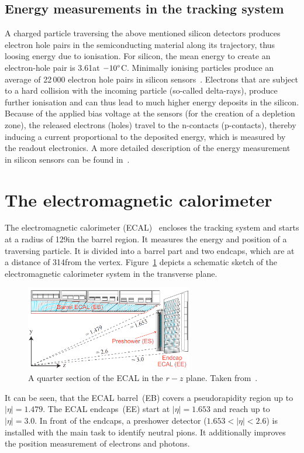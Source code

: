 \subsection*{Energy measurements in the tracking system}
A charged particle traversing the above mentioned silicon detectors produces electron hole pairs in the semiconducting material along its trajectory, thus loosing energy due to ionisation.
For silicon, the mean energy to create an electron-hole pair is 3.61\ev at $-10\degree$C.
Minimally ionising particles produce an average of 22\,000 electron hole pairs in silicon sensors~\cite{Thesis_Jenny}.
Electrons that are subject to a hard collision with the incoming particle (so-called delta-rays), produce further ionisation and can thus lead to much higher energy deposits in the silicon.
Because of the applied bias voltage at the sensors (for the creation of a depletion zone), the released electrons (holes) travel to the n-contacts (p-contacts), thereby inducing a current proportional to the deposited energy, which is measured by the readout electronics. 
A more detailed description of the energy measurement in silicon sensors can be found in~\cite{Thesis_Jenny}.

\section{The electromagnetic calorimeter}
The electromagnetic calorimeter (ECAL)~\cite{bib:CMS:TDR_2006,bib:CMS:TDR_ECAL} encloses the tracking system and starts at a radius of 129\cm in the barrel region.
It measures the energy and position of a traversing particle.
It is divided into a barrel part and two endcaps, which are at a distance of 314\cm from the vertex.
Figure~\ref{fig:ECAL} depicts a schematic sketch of the electromagnetic calorimeter system in the transverse plane.
\begin{figure}[!t]
  \centering
      \includegraphics[width=0.65\textwidth]{figures/experiment/CMS/Figures_Experimental_Apparatus_ECALRapidity.png}
  \caption{A quarter section of the ECAL in the $r-z$ plane. Taken from~\cite{bib:CMS:TDR_2006}.}  
  \label{fig:ECAL}
\end{figure}
It can be seen, that the ECAL barrel~(EB) covers a pseudorapidity region up to $|\eta|=1.479$.
The ECAL endcaps~(EE) start at $|\eta|=1.653$ and reach up to $|\eta|=3.0$.
In front of the endcaps, a preshower detector ($1.653<|\eta|<2.6$) is installed with the main task to identify neutral pions.
It additionally improves the position measurement of electrons and photons.

